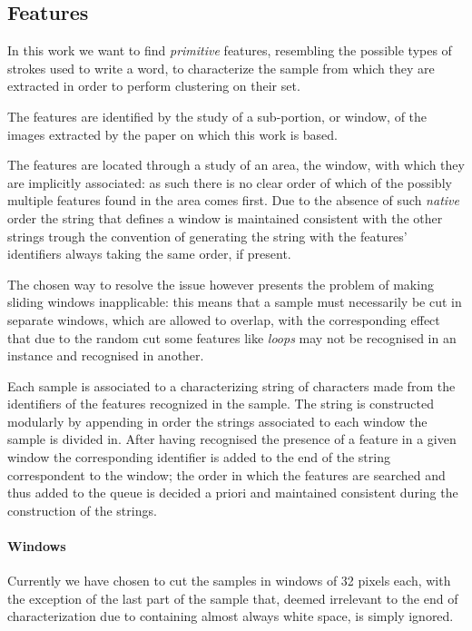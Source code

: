 \subsection{Features}

In this work we want to find \emph{primitive} features, resembling the possible types of strokes used to write a word, to characterize the sample from which they are extracted in order to perform clustering on their set.

The features are identified by the study of a sub-portion, or window, of the images extracted by the paper on which this work is based.

The features are located through a study of an area, the window, with which they are implicitly associated: as such there is no clear order of which of the possibly multiple features found in the area comes first.
Due to the absence of such \emph{native} order the string that defines a window is maintained consistent with the other strings trough the convention of generating the string with the features' identifiers always taking the same order, if present.

The chosen way to resolve the issue however presents the problem of making sliding windows inapplicable: this means that a sample must necessarily be cut in separate windows, which are allowed to overlap, with the corresponding effect that due to the random cut some features like \textit{loops} may not be recognised in an instance and recognised in another. 

Each sample is associated to a characterizing string of characters made from the identifiers of the features recognized in the sample.
The string is constructed modularly by appending in order the strings associated to each window the sample is divided in.
After having recognised the presence of a feature in a given window the corresponding identifier is added to the end of the string correspondent to the window; the order in which the features are searched and thus added to the queue is decided a priori and maintained consistent during the construction of the strings. 


\paragraph{Windows}

Currently we have chosen to cut the samples in windows of 32 pixels each, with the exception of the last part of the sample that, deemed irrelevant to the end of characterization due to containing almost always white space, is simply ignored.


